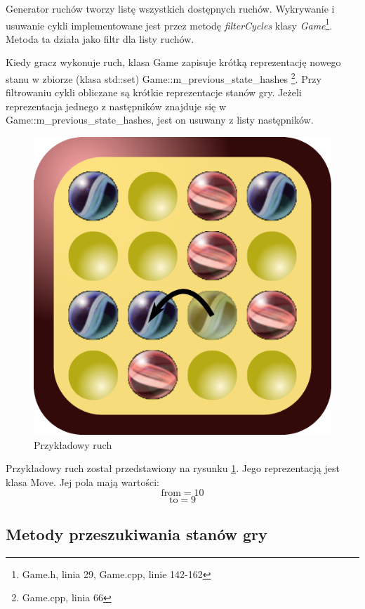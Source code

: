 \documentclass{scrartcl}
\begin{document}
Generator ruchów tworzy listę wszystkich dostępnych ruchów. Wykrywanie
i usuwanie cykli implementowane jest przez metodę \emph{filterCycles}
klasy \emph{Game}\footnote{Game.h, linia 29, Game.cpp, linie 142-162}.
Metoda ta działa jako filtr dla listy ruchów. 

Kiedy gracz wykonuje ruch, klasa Game zapisuje krótką reprezentację
nowego stanu w zbiorze (klasa std::set) Game::m\_previous\_state\_hashes 
\footnote{Game.cpp, linia 66}.
Przy filtrowaniu cykli obliczane są krótkie reprezentacje stanów gry.
Jeżeli reprezentacja jednego z następników znajduje się w 
Game::m\_previous\_state\_hashes, jest on usuwany z listy następników.

\begin{figure}[h]
  \centering
  \includegraphics[scale=0.6]{data/example_move.pdf}
  \caption{Przykładowy ruch}
  \label{fig:example_move}
\end{figure}

Przykładowy ruch został przedstawiony na rysunku
\ref{fig:example_move}. Jego reprezentacją jest klasa Move. Jej 
pola mają wartości:
\[\text{from} = 10\]
\[\text{to} = 9\]

\subsection{Metody przeszukiwania stanów gry}
\end{document}
